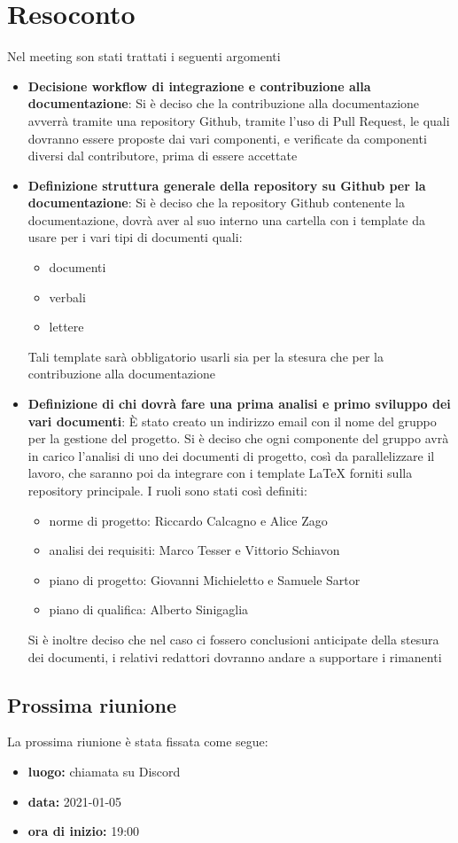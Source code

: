 \section{Resoconto}
Nel meeting son stati trattati i seguenti argomenti
	\begin{itemize}
		\item\textbf{Decisione workflow di integrazione e contribuzione alla documentazione}:
		Si è deciso che la contribuzione alla documentazione avverrà tramite una repository Github, tramite l’uso di Pull Request, le quali dovranno essere proposte dai vari componenti, e verificate da componenti diversi dal contributore, prima di essere accettate
		\item\textbf{Definizione struttura generale della repository su Github per la documentazione}:
		Si è deciso che la repository Github contenente la documentazione, dovrà aver al suo interno una cartella con i template da usare per i vari tipi di documenti quali:
		\begin{itemize}
			\item documenti
			\item verbali
			\item lettere
		\end{itemize}
		Tali template sarà obbligatorio usarli sia per la stesura che per la contribuzione alla documentazione

		\item\textbf{Definizione di chi dovrà fare una prima analisi e primo sviluppo dei vari documenti}:
		È stato creato un indirizzo email con il nome del gruppo per la gestione del progetto.
		Si è deciso che ogni componente del gruppo avrà in carico l’analisi di uno dei documenti di progetto, così da parallelizzare il lavoro, che saranno poi da integrare con i template LaTeX forniti sulla repository principale.
		I ruoli sono stati così definiti:
		\begin{itemize}
			\item norme di progetto: Riccardo Calcagno e Alice Zago
			\item analisi dei requisiti: Marco Tesser e Vittorio Schiavon
			\item piano di progetto: Giovanni Michieletto e Samuele Sartor
			\item piano di qualifica: Alberto Sinigaglia
		\end{itemize}
		Si è inoltre deciso che nel caso ci fossero conclusioni anticipate della stesura dei documenti, i relativi redattori dovranno andare a supportare i rimanenti

	\end{itemize}

\subsection{Prossima riunione}
La prossima riunione è stata fissata come segue:
\begin{itemize}
	\item \textbf{luogo:} chiamata su Discord
	\item \textbf{data:} 2021-01-05
	\item \textbf{ora di inizio:} 19:00
\end{itemize}


